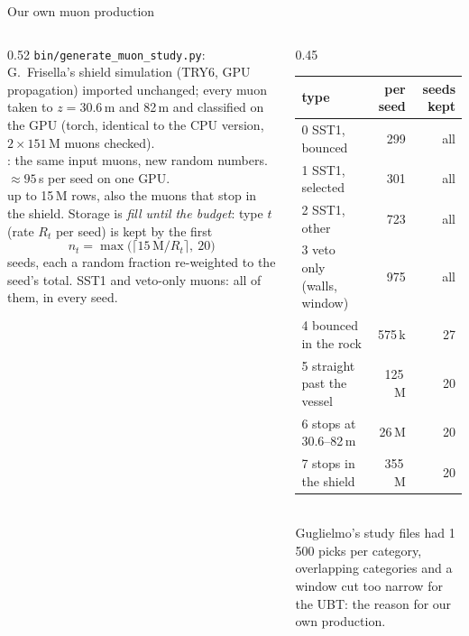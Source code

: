 \documentclass[aspectratio=169,10pt]{beamer}
\begin{document}
\begin{frame}{Our own muon production}
  \begin{columns}[c]
    \begin{column}{0.52\textwidth}\footnotesize
      \texttt{bin/generate\_muon\_study.py}: G.~Frisella's shield simulation (TRY6, GPU propagation) imported unchanged; every muon taken to $z = 30.6$\,m and 82\,m and classified on the GPU (torch, identical to the CPU version, $2\times151$\,M muons checked).\\[1.5mm]
      : the same input muons, new random numbers. $\approx95$\,s per seed on one GPU.\\[1.5mm]
       up to 15\,M rows, also the muons that stop in the shield. Storage is \emph{fill until the budget}: type $t$ (rate $R_t$ per seed) is kept by the first
      \[ n_t = \max\big(\lceil 15\,\text{M}/R_t\rceil,\ 20\big) \]
      seeds, each a random fraction re-weighted to the seed's total. SST1 and veto-only muons: all of them, in every seed.
    \end{column}
    \begin{column}{0.45\textwidth}\scriptsize
      \begin{tabular}{@{}lrr@{}}
        \toprule
        type & per seed & seeds kept\\
        \midrule
        0 SST1, bounced & 299 & all\\
        1 SST1, selected & 301 & all\\
        2 SST1, other & 723 & all\\
        3 veto only (walls, window) & 975 & all\\
        4 bounced in the rock & 575\,k & 27\\
        5 straight past the vessel & 125\,M & 20\\
        6 stops at 30.6--82\,m & 26\,M & 20\\
        7 stops in the shield & 355\,M & 20\\
        \bottomrule
      \end{tabular}\\[1.5mm]
      \footnotesize Guglielmo's study files had 1\,500 picks per category, overlapping categories and a window cut too narrow for the UBT: the reason for our own production.\\[1mm]
    \end{column}
  \end{columns}
\end{frame}
\end{document}
